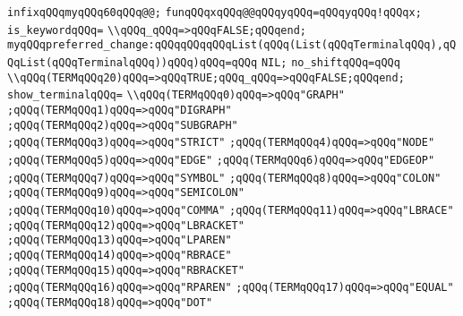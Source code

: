 \verb|infixqQQqmyqQQq60qQQq@@;|\newline
\verb|funqQQqxqQQq@@qQQqyqQQq=qQQqyqQQq!qQQqx;|\newline
\verb|is_keywordqQQq=|\newline
\verb|\\qQQq_qQQq=>qQQqFALSE;qQQqend;|\newline
\verb|myqQQqpreferred_change:qQQqqQQqqQQqList(qQQq(List(qQQqTerminalqQQq),qQQqList(qQQqTerminalqQQq))qQQq)qQQq=qQQq|\newline
\verb|NIL;|\newline
\verb|no_shiftqQQq=qQQq|\newline
\verb|\\qQQq(TERMqQQq20)qQQq=>qQQqTRUE;qQQq_qQQq=>qQQqFALSE;qQQqend;|\newline
\verb|show_terminalqQQq=|\newline
\verb|\\qQQq(TERMqQQq0)qQQq=>qQQq"GRAPH"|\newline
\verb|;qQQq(TERMqQQq1)qQQq=>qQQq"DIGRAPH"|\newline
\verb|;qQQq(TERMqQQq2)qQQq=>qQQq"SUBGRAPH"|\newline
\verb|;qQQq(TERMqQQq3)qQQq=>qQQq"STRICT"|\newline
\verb|;qQQq(TERMqQQq4)qQQq=>qQQq"NODE"|\newline
\verb|;qQQq(TERMqQQq5)qQQq=>qQQq"EDGE"|\newline
\verb|;qQQq(TERMqQQq6)qQQq=>qQQq"EDGEOP"|\newline
\verb|;qQQq(TERMqQQq7)qQQq=>qQQq"SYMBOL"|\newline
\verb|;qQQq(TERMqQQq8)qQQq=>qQQq"COLON"|\newline
\verb|;qQQq(TERMqQQq9)qQQq=>qQQq"SEMICOLON"|\newline
\verb|;qQQq(TERMqQQq10)qQQq=>qQQq"COMMA"|\newline
\verb|;qQQq(TERMqQQq11)qQQq=>qQQq"LBRACE"|\newline
\verb|;qQQq(TERMqQQq12)qQQq=>qQQq"LBRACKET"|\newline
\verb|;qQQq(TERMqQQq13)qQQq=>qQQq"LPAREN"|\newline
\verb|;qQQq(TERMqQQq14)qQQq=>qQQq"RBRACE"|\newline
\verb|;qQQq(TERMqQQq15)qQQq=>qQQq"RBRACKET"|\newline
\verb|;qQQq(TERMqQQq16)qQQq=>qQQq"RPAREN"|\newline
\verb|;qQQq(TERMqQQq17)qQQq=>qQQq"EQUAL"|\newline
\verb|;qQQq(TERMqQQq18)qQQq=>qQQq"DOT"|\newline
